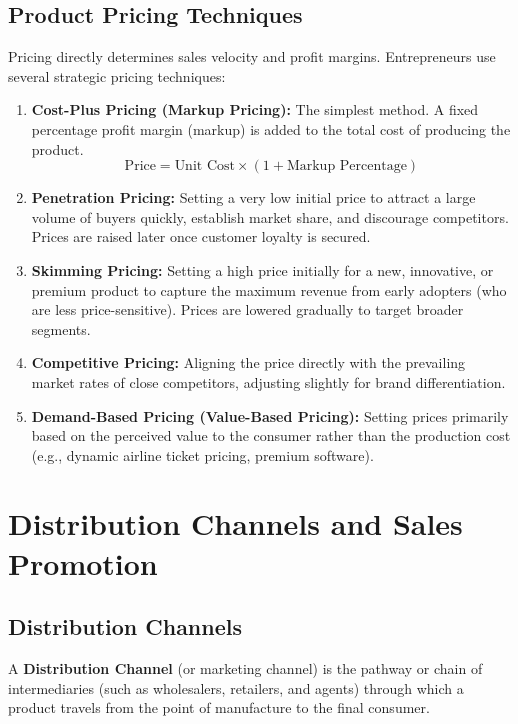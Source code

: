 \documentclass[12pt,a4paper]{article}
\begin{document}
\subsection{Product Pricing Techniques}
Pricing directly determines sales velocity and profit margins. Entrepreneurs use several strategic pricing techniques:
\begin{enumerate}[label=\textbf{\arabic*.}, leftmargin=*, itemsep=4pt]
  \item \textbf{Cost-Plus Pricing (Markup Pricing):} The simplest method. A fixed percentage profit margin (markup) is added to the total cost of producing the product.
    \begin{equation}
      \text{Price} = \text{Unit Cost} \times (1 + \text{Markup Percentage})
    \end{equation}
  \item \textbf{Penetration Pricing:} Setting a very low initial price to attract a large volume of buyers quickly, establish market share, and discourage competitors. Prices are raised later once customer loyalty is secured.
  \item \textbf{Skimming Pricing:} Setting a high price initially for a new, innovative, or premium product to capture the maximum revenue from early adopters (who are less price-sensitive). Prices are lowered gradually to target broader segments.
  \item \textbf{Competitive Pricing:} Aligning the price directly with the prevailing market rates of close competitors, adjusting slightly for brand differentiation.
  \item \textbf{Demand-Based Pricing (Value-Based Pricing):} Setting prices primarily based on the perceived value to the consumer rather than the production cost (e.g., dynamic airline ticket pricing, premium software).
\end{enumerate}

\section{Distribution Channels and Sales Promotion}

\subsection{Distribution Channels}
\begin{tcolorbox}[defbox, title={Definition of Distribution Channel}]
A \textbf{Distribution Channel} (or marketing channel) is the pathway or chain of intermediaries (such as wholesalers, retailers, and agents) through which a product travels from the point of manufacture to the final consumer.
\end{tcolorbox}
\end{document}
